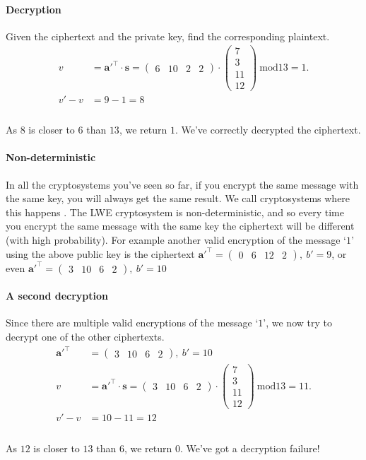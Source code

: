 \documentclass[a4paper, 11pt, openany]{book}
\begin{document}
\paragraph{Decryption}
Given the ciphertext and the private key, find the corresponding plaintext.
\\
\begin{align*}
v &= \textbf{a}'^{\top}\cdot\textbf{s} = \begin{pmatrix}
	6&10&2&2
\end{pmatrix} \cdot \begin{pmatrix} 7 \\ 3 \\ 11 \\ 12 \end{pmatrix}~\text{mod} 13 =  1. \\
v' - v &= 9 - 1 = 8\\
\end{align*}
\\
As $8$ is closer to $6$ than $13$, we return $1$. We've correctly decrypted the ciphertext.
\\
\paragraph{Non-deterministic} In all the cryptosystems you've seen so far, if you encrypt the same message with the same key, you will always get the same result. We call cryptosystems where this happens . The LWE cryptosystem is non-deterministic, and so every time you encrypt the same message with the same key the ciphertext will be different (with high probability). For example another valid encryption of the message `$1$' using the above public key is the ciphertext $\textbf{a}'^{\top} = \begin{pmatrix}
	0&6&12&2
\end{pmatrix},~ b' = 9$, or even $\textbf{a}'^{\top} = \begin{pmatrix}
3&10&6&2
\end{pmatrix},~ b' = 10$
\paragraph{A second decryption} Since there are multiple valid encryptions of the message `$1$', we now try to decrypt one of the other ciphertexts.
\begin{align*}
\textbf{a}'^{\top}& = \begin{pmatrix}
	3&10&6&2
\end{pmatrix},~ b' = 10
\\
v &= \textbf{a}'^{\top}\cdot\textbf{s} = \begin{pmatrix}
	3&10&6&2
\end{pmatrix} \cdot \begin{pmatrix} 7 \\ 3 \\ 11 \\ 12 \end{pmatrix}~\text{mod} 13 =  11.
\\
v' - v &= 10 - 11 = 12\\
\end{align*}
\\
As $12$ is closer to $13$ than $6$, we return $0$. We've got a decryption failure!
\end{document}
